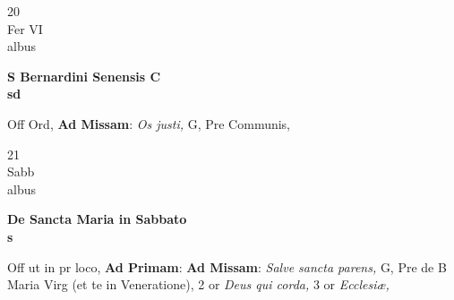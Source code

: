 \documentclass[10pt, openany]{book}
\begin{document}
        \begin{center}
            \begin{minipage}{3.5in}
                \vspace{2em}
                \begin{minipage}{0.5in}
                    {\Huge 20} \\
                    {\normalsize Fer VI} \\
                    {\normalsize albus}
                \end{minipage}
                \begin{minipage}{3.0in}
                    \textbf{ \large S Bernardini Senensis C \\
                    \textnormal{\normalsize sd}} \\ 
                \end{minipage}
                \begin{justify}Off Ord, \textbf{Ad Missam}: \textit{Os justi,} G, Pre Communis,   
                \end{justify}
            \end{minipage}
        \end{center}
    
        \begin{center}
            \begin{minipage}{3.5in}
                \vspace{2em}
                \begin{minipage}{0.5in}
                    {\Huge 21} \\
                    {\normalsize Sabb} \\
                    {\normalsize albus}
                \end{minipage}
                \begin{minipage}{3.0in}
                    \textbf{ \large De Sancta Maria in Sabbato \\
                    \textnormal{\normalsize s}} \\ 
                \end{minipage}
                \begin{justify}Off ut in pr loco, \textbf{Ad Primam}: \textbf{Ad Missam}: \textit{Salve sancta parens,} G, Pre de B Maria Virg (et te in Veneratione), 2 or \textit{Deus qui corda,} 3 or \textit{Ecclesiæ,}   
                \end{justify}
            \end{minipage}
        \end{center}
    
\end{document}

